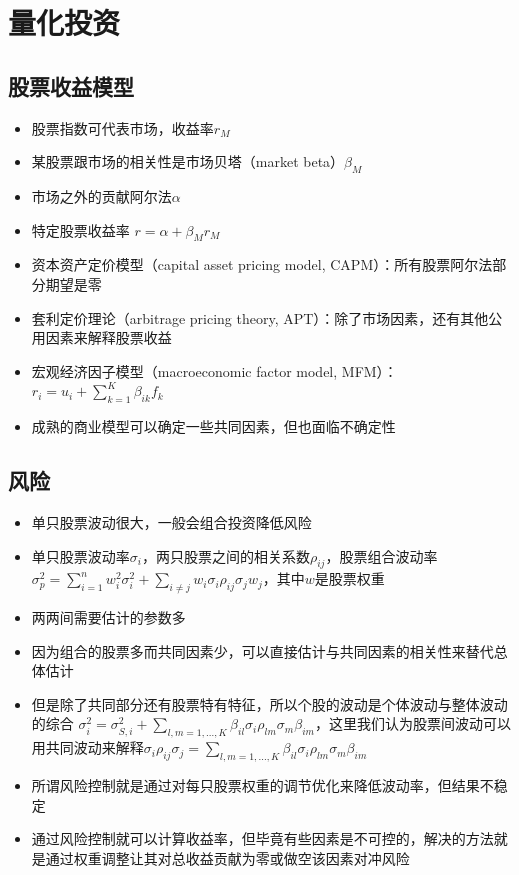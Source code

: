 \documentclass[]{book}
\providecommand{\tightlist}{%
  \setlength{\itemsep}{0pt}\setlength{\parskip}{0pt}}
\begin{document}
\hypertarget{qi}{%
\chapter{量化投资}\label{qi}}

\hypertarget{ux80a1ux7968ux6536ux76caux6a21ux578b}{%
\section{股票收益模型}\label{ux80a1ux7968ux6536ux76caux6a21ux578b}}

\begin{itemize}
\tightlist
\item
  股票指数可代表市场，收益率\(r_M\)
\item
  某股票跟市场的相关性是市场贝塔（market beta）\(\beta_M\)
\item
  市场之外的贡献阿尔法\(\alpha\)
\item
  特定股票收益率 \(r = \alpha + \beta_M r_M\)
\item
  资本资产定价模型（capital asset pricing model, CAPM）：所有股票阿尔法部分期望是零
\item
  套利定价理论（arbitrage pricing theory, APT）：除了市场因素，还有其他公用因素来解释股票收益
\item
  宏观经济因子模型（macroeconomic factor model, MFM）：\(r_i = u_i+\sum_{k=1}^{K}\beta_{ik}f_k\)
\item
  成熟的商业模型可以确定一些共同因素，但也面临不确定性
\end{itemize}

\hypertarget{ux98ceux9669}{%
\section{风险}\label{ux98ceux9669}}

\begin{itemize}
\tightlist
\item
  单只股票波动很大，一般会组合投资降低风险
\item
  单只股票波动率\(\sigma_i\)，两只股票之间的相关系数\(\rho_{ij}\)，股票组合波动率\(\sigma_p^2 = \sum_{i=1}^nw_i^2\sigma_i^2 + \sum_{i\neq j}w_i\sigma_i\rho_{ij}\sigma_jw_j\)，其中\(w\)是股票权重
\item
  两两间需要估计的参数多
\item
  因为组合的股票多而共同因素少，可以直接估计与共同因素的相关性来替代总体估计
\item
  但是除了共同部分还有股票特有特征，所以个股的波动是个体波动与整体波动的综合 \(\sigma_i^2 = \sigma_{S,i}^2 + \sum_{l,m = 1,...,K}\beta_{il}\sigma_i\rho_{lm}\sigma_m\beta_{im}\)，这里我们认为股票间波动可以用共同波动来解释\(\sigma_i\rho_{ij}\sigma_j = \sum_{l,m = 1,...,K}\beta_{il}\sigma_i\rho_{lm}\sigma_m\beta_{im}\)
\item
  所谓风险控制就是通过对每只股票权重的调节优化来降低波动率，但结果不稳定
\item
  通过风险控制就可以计算收益率，但毕竟有些因素是不可控的，解决的方法就是通过权重调整让其对总收益贡献为零或做空该因素对冲风险
\end{itemize}
\end{document}
